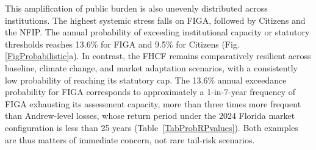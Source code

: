 \documentclass[fleqn,10pt]{wlscirep}
\begin{document}
This amplification of public burden is also unevenly distributed across institutions. The highest systemic stress falls on FIGA, followed by Citizens and the NFIP. The annual probability of exceeding institutional capacity or statutory thresholds reaches 13.6\% for FIGA and 9.5\% for Citizens (Fig. \ref{FigProbabilistic}a). In contrast, the FHCF remains comparatively resilient across baseline, climate change, and market adaptation scenarios, with a consistently low probability of reaching its statutory cap. The 13.6\% annual exceedance probability for FIGA corresponds to approximately a 1-in-7-year frequency of FIGA exhausting its assessment capacity, more than three times more frequent than Andrew-level losses, whose return period under the 2024 Florida market configuration is less than 25 years (Table~\ref{TabProbRPvalues}). Both examples are thus matters of immediate concern, not rare tail-risk scenarios.
\end{document}
